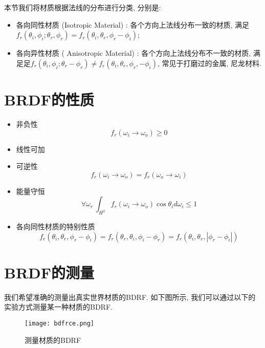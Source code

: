 本节我们将材质根据法线的分布进行分类, 分别是: 
\begin{itemize}
	\item 各向同性材质 (Isotropic Material) : 各个方向上法线分布一致的材质, 满足$f_r(\theta_i,\phi_i;\theta_r,\phi_r)=f_r(\theta_i,\theta_r,\phi_r-\phi_i)$; 
	\item 各向异性材质 ( Anisotropic Material) : 各个方向上法线分布不一致的材质, 满足足$f_r(\theta_i,\phi_i;\theta_r-\phi_r)\neq f_r(\theta_i,\theta_r,\phi_r,-\phi_i)$, 常见于打磨过的金属, 尼龙材料. 
\end{itemize}

\section{BRDF的性质}
\begin{itemize}
	\item 非负性
	\begin{equation}
		f_r(\omega_i\rightarrow \omega_o) \geq 0
	\end{equation}
	\item 线性可加
	\item 可逆性
	\begin{equation}
		f_r(\omega_i\rightarrow \omega_o)=f_r(\omega_o\rightarrow \omega_i)
	\end{equation}
	\item 能量守恒
	\begin{equation}
		\forall\omega_r\ \int_{H^2}f_r(\omega_i\rightarrow \omega_o)\cos\theta_id\omega_i\leq 1
	\end{equation}
	\item 各向同性材质的特别性质
	\begin{equation}
		f_r(\theta_i,\theta_r,\phi_r-\phi_i)=f_r(\theta_r,\theta_i,\phi_i-\phi_r)=f_r(\theta_i,\theta_r,|\phi_r-\phi_i|)
	\end{equation}
\end{itemize}

\section{BRDF的测量}

我们希望准确的测量出真实世界材质的BDRF. 如下图所示, 我们可以通过以下的实验方式测量某一种材质的BDRF. 

\begin{figure}[H]
	\centering
	\texttt{[image: bdfrce.png]}
	\caption{测量材质的BDRF}
	\label{fig:bdrfce}
\end{figure}

